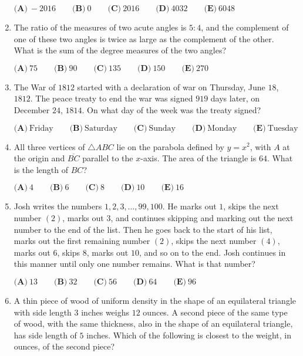 \documentclass{article}
\begin{document}
\begin{enumerate}[label=\arabic*., itemsep=0.5em]
$\textbf{(A)}\ -2016\qquad\textbf{(B)}\ 0\qquad\textbf{(C)}\ 2016\qquad\textbf{(D)}\ 4032\qquad\textbf{(E)}\ 6048$\par \vspace{0.5em}\item The ratio of the measures of two acute angles is $5:4$, and the complement of one of these two angles is twice as large as the complement of the other. What is the sum of the degree measures of the two angles?

$\textbf{(A)}\ 75\qquad\textbf{(B)}\ 90\qquad\textbf{(C)}\ 135\qquad\textbf{(D)}\ 150\qquad\textbf{(E)}\ 270$\par \vspace{0.5em}\item The War of $1812$ started with a declaration of war on Thursday, June $18$, $1812$. The peace treaty to end the war was signed $919$ days later, on December $24$, $1814$. On what day of the week was the treaty signed? 

$\textbf{(A)}\ \text{Friday} \qquad
\textbf{(B)}\ \text{Saturday} \qquad
\textbf{(C)}\ \text{Sunday} \qquad
\textbf{(D)}\ \text{Monday} \qquad
\textbf{(E)}\ \text{Tuesday} $\par \vspace{0.5em}\item All three vertices of $\bigtriangleup ABC$ lie on the parabola defined by $y=x^2$, with $A$ at the origin and $\overline{BC}$ parallel to the $x$-axis. The area of the triangle is $64$. What is the length of $BC$?  

$\textbf{(A)}\ 4\qquad\textbf{(B)}\ 6\qquad\textbf{(C)}\ 8\qquad\textbf{(D)}\ 10\qquad\textbf{(E)}\ 16$\par \vspace{0.5em}\item Josh writes the numbers $1,2,3,\dots,99,100$. He marks out $1$, skips the next number $(2)$, marks out $3$, and continues skipping and marking out the next number to the end of the list. Then he goes back to the start of his list, marks out the first remaining number $(2)$, skips the next number $(4)$, marks out $6$, skips $8$, marks out $10$, and so on to the end. Josh continues in this manner until only one number remains. What is that number?

$\textbf{(A)}\ 13 \qquad
\textbf{(B)}\ 32 \qquad
\textbf{(C)}\ 56 \qquad
\textbf{(D)}\ 64 \qquad
\textbf{(E)}\ 96$\par \vspace{0.5em}\item A thin piece of wood of uniform density in the shape of an equilateral triangle with side length $3$ inches weighs $12$ ounces. A second piece of the same type of wood, with the same thickness, also in the shape of an equilateral triangle, has side length of $5$ inches. Which of the following is closest to the weight, in ounces, of the second piece?


\end{enumerate}
\end{document}
